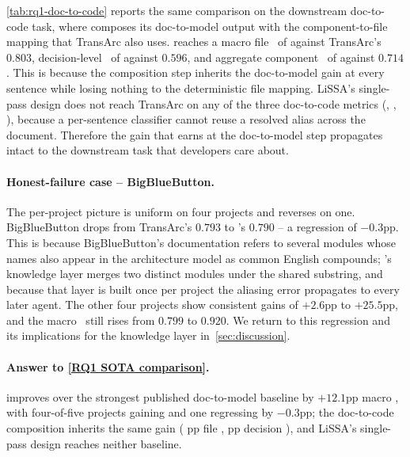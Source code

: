 \autoref{tab:rq1-doc-to-code} reports the same comparison on the downstream doc-to-code task, where \approach{} composes its doc-to-model output with the component-to-file mapping that TransArc also uses.
\approach{} reaches a macro file \fone\ of  against TransArc's $0.803$, decision-level \fone\ of  against $0.596$, and aggregate component \fone\ of  against $0.714$.
This is because the composition step inherits the doc-to-model gain at every sentence while losing nothing to the deterministic file mapping.
LiSSA's single-pass design does not reach TransArc on any of the three doc-to-code metrics (, , ), because a per-sentence classifier cannot reuse a resolved alias across the document.
Therefore the gain that \approach{} earns at the doc-to-model step propagates intact to the downstream task that developers care about.

\paragraph{Honest-failure case -- BigBlueButton.}
The per-project picture is uniform on four projects and reverses on one.
BigBlueButton drops from TransArc's $0.793$ to \approach{}'s $0.790$ -- a regression of $-0.3$pp.
This is because BigBlueButton's documentation refers to several modules whose names also appear in the architecture model as common English compounds; \approach{}'s knowledge layer merges two distinct modules under the shared substring, and because that layer is built once per project the aliasing error propagates to every later agent.
The other four projects show consistent gains of $+2.6$pp to $+25.5$pp, and the macro \fone\ still rises from $0.799$ to $0.920$.
We return to this regression and its implications for the knowledge layer in~\autoref{sec:discussion}.

\paragraph{Answer to \ref{RQ1 SOTA comparison}.}
\approach{} improves over the strongest published doc-to-model baseline by $+12.1$pp macro \fone, with four-of-five projects gaining and one regressing by $-0.3$pp; the doc-to-code composition inherits the same gain ( pp file \fone,  pp decision \fone), and LiSSA's single-pass design reaches neither baseline.

